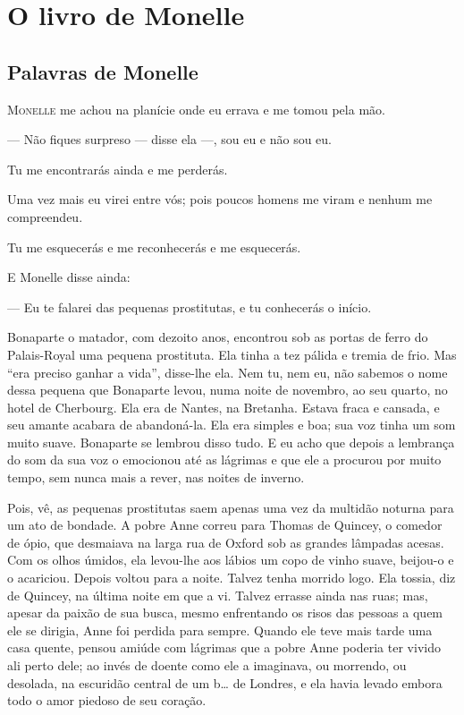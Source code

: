 \part{O livro de Monelle}

\chapter{Palavras de Monelle}  

\textsc{Monelle} me achou na planície onde eu errava e me tomou pela mão.

--- Não fiques surpreso --- disse ela ---, sou eu e não sou eu.

Tu me encontrarás ainda e me perderás.

Uma vez mais eu virei entre vós; pois poucos homens me viram e nenhum
me compreendeu.

Tu me esquecerás e me reconhecerás e me esquecerás.

E Monelle disse ainda: 

--- Eu te falarei das pequenas prostitutas, e tu conhecerás o início.

Bonaparte o matador, com dezoito anos, encontrou sob as portas de ferro
do Palais-Royal uma pequena prostituta. Ela tinha a tez pálida e tremia de
frio. Mas “era preciso ganhar a vida”, disse-lhe ela. Nem tu, nem eu, não
sabemos o nome dessa pequena que Bonaparte levou, numa noite de novembro,
ao seu quarto, no hotel de Cherbourg. Ela era de Nantes, na Bretanha.
Estava fraca e cansada, e seu amante acabara de abandoná-la. Ela era
simples e boa; sua voz tinha um som muito suave. Bonaparte se lembrou disso
tudo. E eu acho que depois a lembrança do som da sua voz o emocionou até
as lágrimas e que ele a procurou por muito tempo, sem nunca mais a rever,
nas noites de inverno.

Pois, vê, as pequenas prostitutas saem apenas uma vez da multidão
noturna para um ato de bondade. A pobre Anne correu para Thomas de
Quincey, o comedor de ópio, que desmaiava na larga rua de Oxford sob as
grandes lâmpadas acesas. Com os olhos úmidos, ela levou-lhe aos lábios um
copo de vinho suave, beijou-o e o acariciou. Depois voltou para a noite.
Talvez tenha morrido logo. Ela tossia, diz de Quincey, na última noite em
que a vi. Talvez errasse ainda nas ruas; mas, apesar da paixão de sua
busca, mesmo enfrentando os risos das pessoas a quem ele se dirigia, Anne
foi perdida para sempre. Quando ele teve mais tarde uma casa quente, pensou
amiúde com lágrimas que a pobre Anne poderia ter vivido ali perto
dele; ao invés de doente como ele a imaginava, ou morrendo, ou desolada,
na escuridão central de um b\ldots{} de Londres, e ela havia levado 
embora todo o amor piedoso de seu coração.

